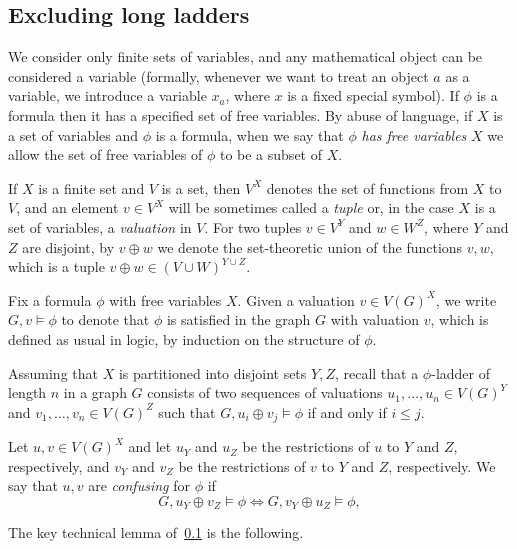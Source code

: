 \subsection{Excluding long ladders}
\label{sec:uqw-stable}


We consider only finite sets of variables, and any mathematical object can be considered a variable (formally, whenever we want to treat an object $a$ as a variable, we  introduce a variable $x_a$, where $x$ is a fixed special symbol).
If $\phi$ is a formula then it has a specified set of free variables.
By abuse of language, if $X$ is a set of variables and $\phi$
is a formula, when we say that $\phi$ \emph{has free variables} $X$
we allow the set of free variables of $\phi$ to be a subset of $X$.

If $X$ is a finite set and $V$ is a set, then $V^X$ denotes the set of functions from $X$ to $V$, and an element $v\in V^X$ will be sometimes called a \emph{tuple} or, in the case $X$ is a set of variables, a \emph{valuation} in $V$.
For two tuples
$v\in V^Y$ and $w\in  W^Z$, where $Y$ and $Z$ are disjoint, by
$v\oplus w$ we denote the set-theoretic union of the functions $v,w$,
which is a tuple $v\oplus w\in (V\cup W)^{Y\cup Z}$.


Fix a formula $\phi$ with free variables $X$.
Given a valuation $v\in V(G)^X$, we write $G,v\models \phi$ to denote that $\phi$ is satisfied 
in the graph $G$ with valuation $v$, which is defined as usual in logic, by induction on the structure of $\phi$.


Assuming that  $X$ is partitioned into disjoint sets $Y,Z$, recall that a $\phi$-ladder of length $n$ in a graph $G$ consists of two sequences of valuations $u_1,\ldots,u_n\in V(G)^Y$
    and $v_1,\ldots,v_n\in V(G)^Z$
     such that $G,u_i\oplus v_j\models \phi$ if and only if $i\le j$.
    
    
    
		Let $u,v\in V(G)^X$ 
		and let $u_Y$ and $u_Z$ be the restrictions of $u$ to $Y$ and $Z$, respectively,
and $v_Y$ and $v_Z$ be the restrictions of $v$ to $Y$ and $Z$, respectively.
		We say that $u,v$ are \emph{confusing} for $\phi$
		if $$G,u_Y\oplus v_Z\models \phi\iff G,v_Y\oplus u_Z\models \phi,$$
		



\medskip
The key technical lemma of~\cref{sec:uqw-stable} is the following.

